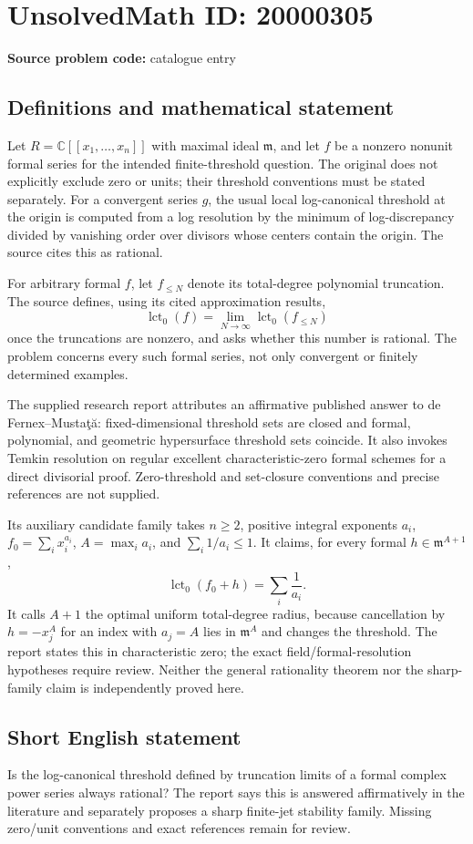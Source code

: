 \documentclass[11pt]{article}
\newcommand{\C}{\mathbb{C}}
\begin{document}
\section*{UnsolvedMath ID: 20000305}
\textbf{Source problem code:} catalogue entry
\subsection{Definitions and mathematical statement}
Let $R=\C[[x_1,\ldots,x_n]]$ with maximal ideal $\mathfrak m$, and let $f$ be a nonzero nonunit formal series for the intended finite-threshold question. The original does not explicitly exclude zero or units; their threshold conventions must be stated separately. For a convergent series $g$, the usual local log-canonical threshold at the origin is computed from a log resolution by the minimum of log-discrepancy divided by vanishing order over divisors whose centers contain the origin. The source cites this as rational.

For arbitrary formal $f$, let $f_{\leq N}$ denote its total-degree polynomial truncation. The source defines, using its cited approximation results,
\[
 \operatorname{lct}_0(f)=\lim_{N\to\infty}\operatorname{lct}_0(f_{\leq N})
\]
once the truncations are nonzero, and asks whether this number is rational. The problem concerns every such formal series, not only convergent or finitely determined examples.

The supplied research report attributes an affirmative published answer to de Fernex--Musta\c t\u a: fixed-dimensional threshold sets are closed and formal, polynomial, and geometric hypersurface threshold sets coincide. It also invokes Temkin resolution on regular excellent characteristic-zero formal schemes for a direct divisorial proof. Zero-threshold and set-closure conventions and precise references are not supplied.

Its auxiliary candidate family takes $n\geq2$, positive integral exponents $a_i$, $f_0=\sum_i x_i^{a_i}$, $A=\max_i a_i$, and $\sum_i1/a_i\leq1$. It claims, for every formal $h\in\mathfrak m^{A+1}$,
\[
 \operatorname{lct}_0(f_0+h)=\sum_i\frac1{a_i}.
\]
It calls $A+1$ the optimal uniform total-degree radius, because cancellation by $h=-x_j^A$ for an index with $a_j=A$ lies in $\mathfrak m^A$ and changes the threshold. The report states this in characteristic zero; the exact field/formal-resolution hypotheses require review. Neither the general rationality theorem nor the sharp-family claim is independently proved here.
\subsection{Short English statement}
Is the log-canonical threshold defined by truncation limits of a formal complex power series always rational? The report says this is answered affirmatively in the literature and separately proposes a sharp finite-jet stability family. Missing zero/unit conventions and exact references remain for review.
\end{document}
